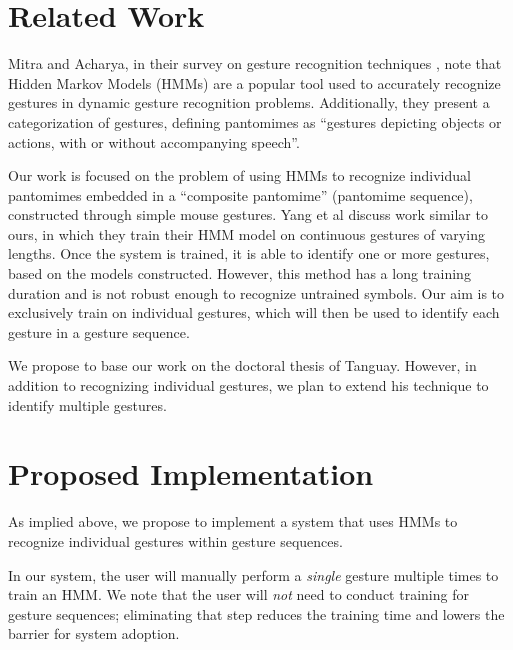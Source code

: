 \documentclass[twoside]{article}
\begin{document}
\begin{multicols}{2}
\section{Related Work}

Mitra and Acharya, in their survey on gesture recognition techniques \cite{mitra_gesture_2007}, 
note that Hidden Markov Models (HMMs) are a popular tool used to 
accurately recognize gestures in dynamic gesture recognition problems. 
Additionally, they present a categorization of gestures,
defining pantomimes as ``gestures depicting objects or actions, with or without
accompanying speech''. 

Our work is focused on the problem of using HMMs to
recognize individual pantomimes embedded in a ``composite pantomime'' (pantomime
sequence), constructed through simple mouse gestures. %
Yang et al \cite{yang_gesture_1994} discuss work similar to ours, in which they train their HMM model on continuous gestures of varying lengths. Once the system is trained, it is able to identify one or more gestures, based on the models constructed. However, this method has a long training duration and is not robust enough to recognize untrained symbols. Our aim is to exclusively train on individual gestures, which will then be used to identify each gesture in a gesture sequence. 

We propose to base our work on the doctoral thesis of Tanguay\cite{tanguay_jr_hidden_1995}. However, in addition to recognizing individual gestures, we plan to extend his technique to identify multiple gestures.


\section{Proposed Implementation}

As implied above, we propose to implement a system that uses HMMs 
to recognize individual gestures within gesture sequences.

In our system, the user will manually perform a \emph{single} gesture multiple times to train an HMM. We note that the user will \emph{not} need to conduct training for
gesture sequences; eliminating that step reduces the training time and lowers
the barrier for system adoption.


\end{multicols}
\end{document}
